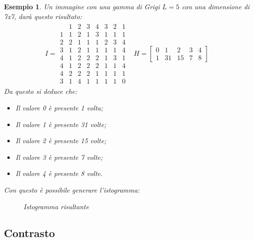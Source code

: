 \documentclass{report}
\newtheorem{esempio}{Esempio}[section]
\begin{document}
\begin{esempio}
  Un immagine con una gamma di Grigi $L=5$ con una dimensione di 7x7, darà
  questo risultato:
  \begin{eqnarray}
    \label{eq:calc-isto}
    I = \begin{array}{c|ccccccc}
      & 1 & 2 & 3 & 4 & 3 & 2 & 1 \\\hline
      1 & 1 & 2 & 1 & 3 & 1 & 1 & 1 \\
      2 & 2 & 1 & 1 & 1 & 2 & 3 & 4 \\
      3 & 1 & 2 & 1 & 1 & 1 & 1 & 4 \\
      4 & 1 & 2 & 2 & 2 & 1 & 3 & 1 \\
      4 & 1 & 2 & 2 & 2 & 1 & 1 & 4 \\
      4 & 2 & 2 & 2 & 1 & 1 & 1 & 1 \\
      3 & 1 & 4 & 1 & 1 & 1 & 1 & 0
    \end{array} &
                  H = \begin{bmatrix}
                    0 & 1 & 2 & 3 & 4\\ 
                    1 & 31 & 15 & 7 & 8
                  \end{bmatrix}
  \end{eqnarray}
  Da questo si deduce che:
  \begin{itemize}
  \item Il valore 0 è presente 1 volta;
  \item Il valore 1 è presente 31 volte;
  \item Il valore 2 è presente 15 volte;
  \item Il valore 3 è presente 7 volte;
  \item Il valore 4 è presente 8 volte.
  \end{itemize}
  Con questo è possibile generare l'istogramma:
  \begin{figure}[ht!]
    \centering
    \caption{Istogramma risultante}
    \label{fig:calc-isto}
  \end{figure}
\end{esempio}

\subsection{Contrasto}
\label{sec:contrasto}
\end{document}
